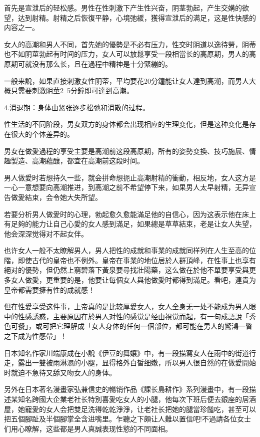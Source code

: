 \documentclass[12pt,UTF8]{ctexbook}
\begin{document}
首先是宣泄后的轻松感。男性在性刺激下产生性兴奋，阴茎勃起，产生交媾的欲望，达到射精。射精之后恢復平静，心境弛緩，獲得宣泄后的满足，这是性快感的内容之一。

女人的高潮和男人不同，首先她的優勢是不必有压力，性交时阴道以逸待勞，阴蒂也不如阴莖勃起有时间的压力，女人可以放鬆享受一段相當长的高原期，男人的高原期可就没有那么长，且在過程中精神是十分緊繃的。

一般来說，如果直接刺激女性阴蒂，平均要花20分鐘能让女人達到高潮，而男人大概只需要刺激阴莖2~5分鐘即可達到高潮。

4.消退期：身体由紧张逐步松弛和消散的过程。

性生活的不同阶段，男女双方的身体都会出现相应的生理变化，但是这种变化是存在很大的个体差异的。

男女在做愛過程的享受主要是高潮前这段高原期，所有的姿勢变換、技巧施展、情趣製造、高潮蘊釀，都宜在高潮前这段时间。

男人做愛时若想持久一些，就会拼命想扼止高潮射精的衝動，相反地，女人这方是一心一意想要向高潮推进，到高潮之前不希望停下来，如果男人太早射精，无异宣告做愛結束，会令她大失所望。

若要分析男人做愛时的心理，勃起愈久愈能滿足他的自信心，因为这表示他在床上有足夠的能力让自己心愛的女人感到滿足，如果總是草草結束，老是让女人失望，他会深深觉得对不起女伴。

也许女人一般不太瞭解男人，男人把性的成就和事業的成就同样列在人生至高的位階，即使古代的皇帝也不例外。皇帝在事業的地位居於人群頂峰，在性事上也享有絕对的優勢，但仍然上窮碧落下黃泉要尋找壯陽藥，这么做在於他不單要享受與更多女人做愛，更重要的是，他要让每個女人與他做愛时都得到滿足。看吧，連貴为皇帝都需要擁有性的成就感！

但在性愛享受这件事，上帝真的是比较厚愛女人，女人全身无一处不能成为男人眼中的性感誘惑，主要原因在於男人对性的感觉是经由視觉而起，有一句成語說「秀色可餐」，或可把它理解成「女人身体的任何一個部位，都可能在男人的驚鴻一瞥之下成为性感帶」！

日本知名作家川端康成在小說《伊豆的舞孃》中，有一段描寫女人在雨中的街道行走，露出一雙被雨淋濕的小腿，显得格外白皙细嫩，所以男人很自然的在做愛開始时就迫不急待又舔又吻女人的身体。

另外在日本著名漫畫家弘兼信史的暢销作品《課长島耕作》系列漫畫中，有一段描述某知名跨國大企業老社长特別喜愛吃女人的小腿，他每次下班后便去銀座的居酒屋，她寵愛的女人会把雙足洗得乾乾淨淨，让老社长把她的腿當珍饈吃，甚至可以把五個腳趾及半個腳掌全含进嘴里。乍聽之下頗让人難以置信吧!不過請各位女士们用心瞭解，这些都是男人真誠表现性慾的不同面相。
\end{document}
